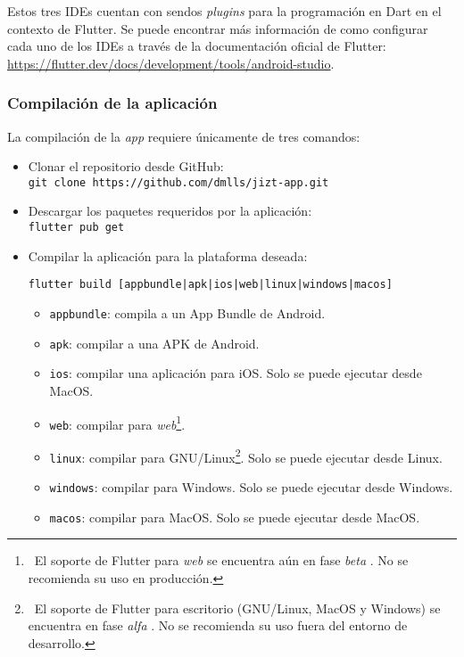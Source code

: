 Estos tres IDEs cuentan con sendos \emph{plugins} para la programación en Dart en el contexto de Flutter. Se puede encontrar más información de como configurar cada uno de los IDEs a través de la documentación oficial de Flutter: \href{https://flutter.dev/docs/development/tools/android-studio}{https://flutter.dev/docs/development/tools/android-studio}.


\subsubsection{Compilación de la aplicación}

La compilación de la \emph{app} requiere únicamente de tres comandos:

\vspace{-0.2cm}
\begin{itemize} [\textbullet]
	\item Clonar el repositorio desde GitHub: \\
	\texttt{git clone https://github.com/dmlls/jizt-app.git}
	
	\item Descargar los paquetes requeridos por la aplicación: \\
	\texttt{flutter pub get}
	
	\item Compilar la aplicación para la plataforma deseada:
	
	\texttt{flutter build [appbundle|apk|ios|web|linux|windows|macos]}
	
	\begin{itemize} [◦]
		\item \texttt{appbundle}: compila a un App Bundle de Android.
		\item \texttt{apk}: compilar a una APK de Android.
		\item \texttt{ios}: compilar una aplicación para iOS. Solo se puede ejecutar desde MacOS.
		\item \texttt{web}: compilar para \emph{web}\footnote{\, El soporte de Flutter para \emph{web} se encuentra aún en fase \emph{beta} \cite{flutter-web}. No se recomienda su uso en producción.}.
		\item \texttt{linux}: compilar para GNU/Linux\footnote{\, El soporte de Flutter para escritorio (GNU/Linux, MacOS y Windows) se encuentra en fase \emph{alfa} \cite{flutter-desktop}. No se recomienda su uso fuera del entorno de desarrollo.}. Solo se puede ejecutar desde Linux.
		\item \texttt{windows}: compilar para Windows. Solo se puede ejecutar desde Windows.
		\item \texttt{macos}: compilar para MacOS. Solo se puede ejecutar desde MacOS.
	\end{itemize}
\end{itemize}

